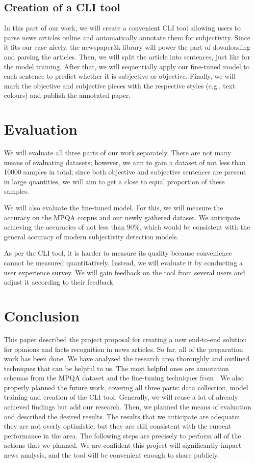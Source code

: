 \documentclass[conference]{IEEEtran}
\begin{document}
\subsection{Creation of a CLI tool}
In this part of our work, we will create a convenient CLI tool allowing users to parse news articles online and automatically annotate them for subjectivity. Since it fits our case nicely, the newspaper3k library will power the part of downloading and parsing the articles. Then, we will split the article into sentences, just like for the model training. After that, we will sequentially apply our fine-tuned model to each sentence to predict whether it is subjective or objective. Finally, we will mark the objective and subjective pieces with the respective styles (e.g., text colours) and publish the annotated paper.

\section{Evaluation}
We will evaluate all three parts of our work separately. There are not many means of evaluating datasets; however, we aim to gain a dataset of not less than 10000 samples in total; since both objective and subjective sentences are present in large quantities, we will aim to get a close to equal proportion of these samples.

We will also evaluate the fine-tuned model. For this, we will measure the accuracy on the MPQA corpus and our newly gathered dataset. We anticipate achieving the accuracies of not less than 90\%, which would be consistent with the general accuracy of modern subjectivity detection models.

As per the CLI tool, it is harder to measure its quality because convenience cannot be measured quantitatively. Instead, we will evaluate it by conducting a user experience survey. We will gain feedback on the tool from several users and adjust it according to their feedback.

\section{Conclusion}
This paper described the project proposal for creating a new end-to-end solution for opinions and facts recognition in news articles. So far, all of the preparation work has been done. We have analysed the research area thoroughly and outlined techniques that can be helpful to us. The most helpful ones are annotation schemas from the MPQA dataset and the fine-tuning techniques from \cite{bert-finetune}. We also properly planned the future work, covering all three parts: data collection, model training and creation of the CLI tool. Generally, we will reuse a lot of already achieved findings but add our research. Then, we planned the means of evaluation and described the desired results. The results that we anticipate are adequate: they are not overly optimistic, but they are still consistent with the current performance in the area. The following steps are precisely to perform all of the actions that we planned. We are confident this project will significantly impact news analysis, and the tool will be convenient enough to share publicly.




\vspace{12pt}

\end{document}
